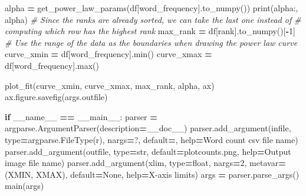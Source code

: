 \documentclass[
]{krantz}
\makeatletter
\newenvironment{Shaded}{\begin{snugshade}}{\end{snugshade}}
\newcommand{\BuiltInTok}[1]{#1}
\newcommand{\CommentTok}[1]{\textcolor[rgb]{0.56,0.35,0.01}{\textit{#1}}}
\newcommand{\ControlFlowTok}[1]{\textcolor[rgb]{0.13,0.29,0.53}{\textbf{#1}}}
\newcommand{\DecValTok}[1]{\textcolor[rgb]{0.00,0.00,0.81}{#1}}
\newcommand{\NormalTok}[1]{#1}
\newcommand{\OperatorTok}[1]{\textcolor[rgb]{0.81,0.36,0.00}{\textbf{#1}}}
\newcommand{\StringTok}[1]{\textcolor[rgb]{0.31,0.60,0.02}{#1}}
\newcommand{\VariableTok}[1]{\textcolor[rgb]{0.00,0.00,0.00}{#1}}
\newenvironment{kframe}{%
\medskip{}
\setlength{\fboxsep}{.8em}
 \def\at@end@of@kframe{}%
 \ifinner\ifhmode%
  \def\at@end@of@kframe{\end{minipage}}%
  \begin{minipage}{\columnwidth}%
 \fi\fi%
 \def\FrameCommand##1{\hskip\@totalleftmargin \hskip-\fboxsep
 \colorbox{shadecolor}{##1}\hskip-\fboxsep
     \hskip-\linewidth \hskip-\@totalleftmargin \hskip\columnwidth}%
 \MakeFramed {\advance\hsize-\width
   \@totalleftmargin\z@ \linewidth\hsize
   \@setminipage}}%
 {\par\unskip\endMakeFramed%
 \at@end@of@kframe}
\renewenvironment{Shaded}{\begin{kframe}}{\end{kframe}}
\makeatother
\begin{document}
\begin{Shaded}
\begin{Highlighting}[]
\NormalTok{    alpha }\OperatorTok{=}\NormalTok{ get\_power\_law\_params(df[}\StringTok{\textquotesingle{}word\_frequency\textquotesingle{}}\NormalTok{].to\_numpy())}
    \BuiltInTok{print}\NormalTok{(}\StringTok{\textquotesingle{}alpha:\textquotesingle{}}\NormalTok{, alpha)}
    \CommentTok{\# Since the ranks are already sorted, we can take the last one instead of}
    \CommentTok{\# computing which row has the highest rank}
\NormalTok{    max\_rank }\OperatorTok{=}\NormalTok{ df[}\StringTok{\textquotesingle{}rank\textquotesingle{}}\NormalTok{].to\_numpy()[}\OperatorTok{{-}}\DecValTok{1}\NormalTok{]}
    \CommentTok{\# Use the range of the data as the boundaries when drawing the power law curve}
\NormalTok{    curve\_xmin }\OperatorTok{=}\NormalTok{ df[}\StringTok{\textquotesingle{}word\_frequency\textquotesingle{}}\NormalTok{].}\BuiltInTok{min}\NormalTok{()}
\NormalTok{    curve\_xmax }\OperatorTok{=}\NormalTok{ df[}\StringTok{\textquotesingle{}word\_frequency\textquotesingle{}}\NormalTok{].}\BuiltInTok{max}\NormalTok{()}

\NormalTok{    plot\_fit(curve\_xmin, curve\_xmax, max\_rank, alpha, ax)}
\NormalTok{    ax.figure.savefig(args.outfile)}


\ControlFlowTok{if} \VariableTok{\_\_name\_\_} \OperatorTok{==} \StringTok{\textquotesingle{}\_\_main\_\_\textquotesingle{}}\NormalTok{:}
\NormalTok{    parser }\OperatorTok{=}\NormalTok{ argparse.ArgumentParser(description}\OperatorTok{=}\NormalTok{\_\_doc\_\_)}
\NormalTok{    parser.add\_argument(}\StringTok{\textquotesingle{}infile\textquotesingle{}}\NormalTok{, }\BuiltInTok{type}\OperatorTok{=}\NormalTok{argparse.FileType(}\StringTok{\textquotesingle{}r\textquotesingle{}}\NormalTok{), nargs}\OperatorTok{=}\StringTok{\textquotesingle{}?\textquotesingle{}}\NormalTok{,}
\NormalTok{                        default}\OperatorTok{=}\StringTok{\textquotesingle{}{-}\textquotesingle{}}\NormalTok{, }\BuiltInTok{help}\OperatorTok{=}\StringTok{\textquotesingle{}Word count csv file name\textquotesingle{}}\NormalTok{)}
\NormalTok{    parser.add\_argument(}\StringTok{\textquotesingle{}{-}{-}outfile\textquotesingle{}}\NormalTok{, }\BuiltInTok{type}\OperatorTok{=}\BuiltInTok{str}\NormalTok{, default}\OperatorTok{=}\StringTok{\textquotesingle{}plotcounts.png\textquotesingle{}}\NormalTok{,}
                        \BuiltInTok{help}\OperatorTok{=}\StringTok{\textquotesingle{}Output image file name\textquotesingle{}}\NormalTok{)}
\NormalTok{    parser.add\_argument(}\StringTok{\textquotesingle{}{-}{-}xlim\textquotesingle{}}\NormalTok{, }\BuiltInTok{type}\OperatorTok{=}\BuiltInTok{float}\NormalTok{, nargs}\OperatorTok{=}\DecValTok{2}\NormalTok{, metavar}\OperatorTok{=}\NormalTok{(}\StringTok{\textquotesingle{}XMIN\textquotesingle{}}\NormalTok{, }\StringTok{\textquotesingle{}XMAX\textquotesingle{}}\NormalTok{),}
\NormalTok{                        default}\OperatorTok{=}\VariableTok{None}\NormalTok{, }\BuiltInTok{help}\OperatorTok{=}\StringTok{\textquotesingle{}X{-}axis limits\textquotesingle{}}\NormalTok{)}
\NormalTok{    args }\OperatorTok{=}\NormalTok{ parser.parse\_args()}
\NormalTok{    main(args)}
\end{Highlighting}
\end{Shaded}
\end{document}
